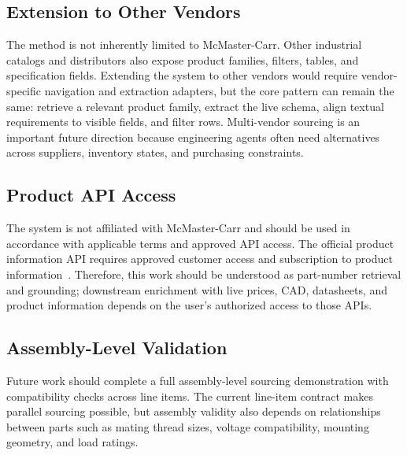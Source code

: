 \documentclass[colorlinks,upint,subscriptcorrection,varvw,hyphenate,balance,nofoot]{asmeconf}
\begin{document}
\subsection{Extension to Other Vendors}

The method is not inherently limited to McMaster-Carr. Other industrial catalogs and distributors also expose product families, filters, tables, and specification fields. Extending the system to other vendors would require vendor-specific navigation and extraction adapters, but the core pattern can remain the same: retrieve a relevant product family, extract the live schema, align textual requirements to visible fields, and filter rows. Multi-vendor sourcing is an important future direction because engineering agents often need alternatives across suppliers, inventory states, and purchasing constraints.

\subsection{Product API Access}

The system is not affiliated with McMaster-Carr and should be used in accordance with applicable terms and approved API access. The official product information API requires approved customer access and subscription to product information~\cite{mcmasterapi}. Therefore, this work should be understood as part-number retrieval and grounding; downstream enrichment with live prices, CAD, datasheets, and product information depends on the user's authorized access to those APIs.

\subsection{Assembly-Level Validation}

Future work should complete a full assembly-level sourcing demonstration with compatibility checks across line items. The current line-item contract makes parallel sourcing possible, but assembly validity also depends on relationships between parts such as mating thread sizes, voltage compatibility, mounting geometry, and load ratings.



\end{document}
